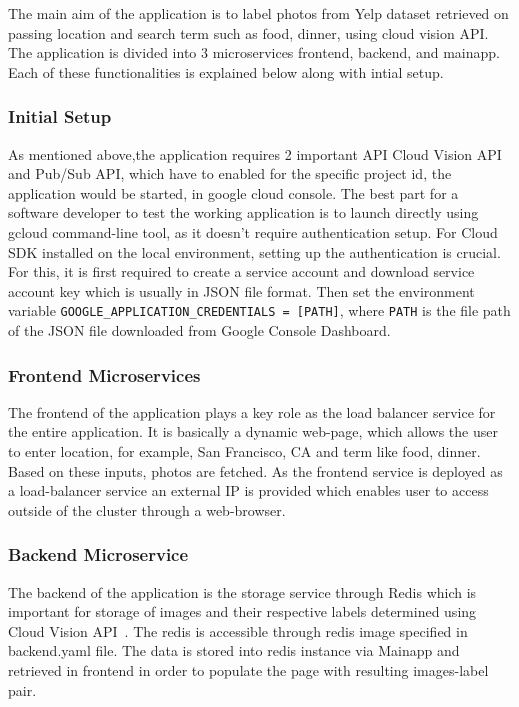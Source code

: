 The main aim of the application is to label photos from Yelp dataset
retrieved on passing location and search term such as food, dinner,
using cloud vision API. The application is divided into 3
microservices frontend, backend, and mainapp. Each of these
functionalities is explained below along with intial setup.

\subsubsection{Initial Setup} 

As mentioned above,the application requires 2 important API Cloud
Vision API and Pub/Sub API, which have to enabled for the specific
project id, the application would be started, in google cloud
console. The best part for a software developer to test the working
application is to launch directly using gcloud command-line tool, as
it doesn’t require authentication setup.  For Cloud SDK installed on
the local environment, setting up the authentication is crucial. For
this, it is first required to create a service account and download
service account key which is usually in JSON file format. Then set the
environment variable \verb|GOOGLE_APPLICATION_CREDENTIALS = [PATH]|,
where \verb|PATH| is the file path of the JSON file downloaded from Google
Console Dashboard.

\subsubsection{Frontend Microservices} 

The frontend of the application plays a key role as the load balancer
service for the entire application. It is basically a dynamic
web-page, which allows the user to enter location, for example, San
Francisco, CA and term like food, dinner. Based on these inputs,
photos are fetched. As the frontend service is deployed as a
load-balancer service an external IP is provided which enables user to
access outside of the cluster through a web-browser.

\subsubsection{Backend Microservice} 

The backend of the application is the storage service through Redis
which is important for storage of images and their respective labels
determined using Cloud Vision API~\cite{hid-sp18-602-redis}. The redis
is accessible through redis image specified in backend.yaml file. The
data is stored into redis instance via Mainapp and retrieved in
frontend in order to populate the page with resulting images-label
pair.

